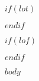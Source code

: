 \documentclass[ms]{uncgdissertationexp}
\theoremstyle{plain}
\theoremstyle{definition}
\theoremstyle{remark}
\begin{document}
\tableofcontents


  $if(lot)$
\listoftables
  $endif$



  $if(lof)$
\listoffigures
  $endif$


\mainmatter %
 
  $body$





\appendix


\end{document}

